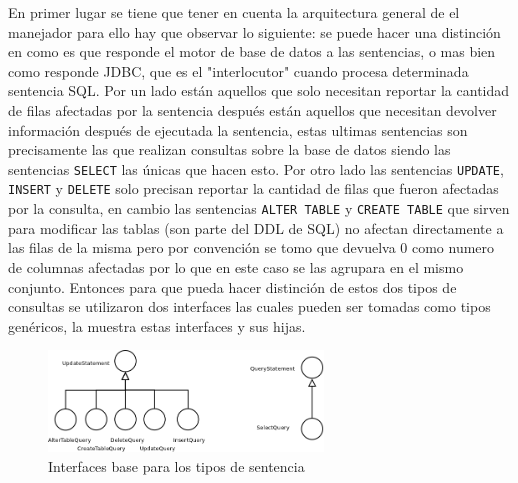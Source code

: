 En primer lugar se tiene que tener en cuenta la arquitectura general de el manejador para ello hay que observar lo siguiente: se puede hacer una distinción en como es que responde el motor de base de datos a las sentencias, o mas bien como responde JDBC, que es el "interlocutor" cuando procesa determinada sentencia SQL. Por un lado están aquellos que solo necesitan reportar la cantidad de filas afectadas por la sentencia después están aquellos que necesitan devolver información después de ejecutada la sentencia, estas ultimas sentencias son precisamente las que realizan consultas sobre la base de datos siendo las sentencias \verb=SELECT= las únicas que hacen esto. Por otro lado las sentencias \verb=UPDATE=, \verb=INSERT= y \verb=DELETE= solo precisan reportar la cantidad de filas que fueron afectadas por la consulta, en cambio las sentencias \verb=ALTER TABLE= y \verb=CREATE TABLE= que sirven para modificar las tablas (son parte del DDL de SQL) no afectan directamente a las filas de la misma pero por convención se tomo que \jd devuelva 0 como numero de columnas afectadas por lo que en este caso se las agrupara en el mismo conjunto. Entonces para que \jj pueda hacer distinción de estos dos tipos de consultas se utilizaron dos interfaces las cuales pueden ser tomadas como tipos genéricos, la  muestra estas interfaces y sus hijas.
%
\begin{figure}
  \centering
    \includegraphics[width=0.65\textwidth]{figuras/crossdb-base.png}
  \caption{Interfaces base para los tipos de sentencia}
  \label{fig:crossdb-base}
\end{figure}

